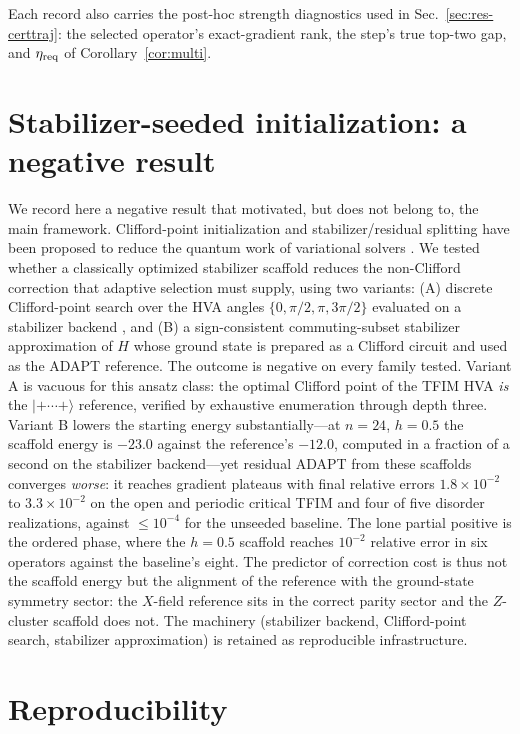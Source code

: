 \documentclass[aps,pra,reprint,superscriptaddress,nofootinbib,floatfix]{revtex4-2}
\newcommand{\ket}[1]{\lvert #1\rangle}
\begin{document}
Each record also carries the post-hoc strength diagnostics used in Sec.~\ref{sec:res-certtraj}: the selected operator's exact-gradient rank, the step's true top-two gap, and $\eta_{\rm req}$ of Corollary~\ref{cor:multi}.

\section{Stabilizer-seeded initialization: a negative result}
\label{app:stab}

We record here a negative result that motivated, but does not belong to, the main framework. Clifford-point initialization and stabilizer/residual splitting have been proposed to reduce the quantum work of variational solvers \cite{cheng2025clifford,robin2025stabilizer,yoo2025symmetry}. We tested whether a classically optimized stabilizer scaffold reduces the non-Clifford correction that adaptive selection must supply, using two variants: (A) discrete Clifford-point search over the HVA angles $\{0,\pi/2,\pi,3\pi/2\}$ evaluated on a stabilizer backend \cite{gidney2021stim,aaronson2004stabilizer}, and (B) a sign-consistent commuting-subset stabilizer approximation of $H$ whose ground state is prepared as a Clifford circuit and used as the ADAPT reference. The outcome is negative on every family tested. Variant A is vacuous for this ansatz class: the optimal Clifford point of the TFIM HVA \emph{is} the $\ket{+\cdots+}$ reference, verified by exhaustive enumeration through depth three. Variant B lowers the starting energy substantially---at $n=24$, $h=0.5$ the scaffold energy is $-23.0$ against the reference's $-12.0$, computed in a fraction of a second on the stabilizer backend---yet residual ADAPT from these scaffolds converges \emph{worse}: it reaches gradient plateaus with final relative errors $1.8\times10^{-2}$ to $3.3\times10^{-2}$ on the open and periodic critical TFIM and four of five disorder realizations, against $\le10^{-4}$ for the unseeded baseline. The lone partial positive is the ordered phase, where the $h=0.5$ scaffold reaches $10^{-2}$ relative error in six operators against the baseline's eight. The predictor of correction cost is thus not the scaffold energy but the alignment of the reference with the ground-state symmetry sector: the $X$-field reference sits in the correct parity sector and the $Z$-cluster scaffold does not. The machinery (stabilizer backend, Clifford-point search, stabilizer approximation) is retained as reproducible infrastructure.

\section{Reproducibility}
\label{app:repro}
\end{document}
